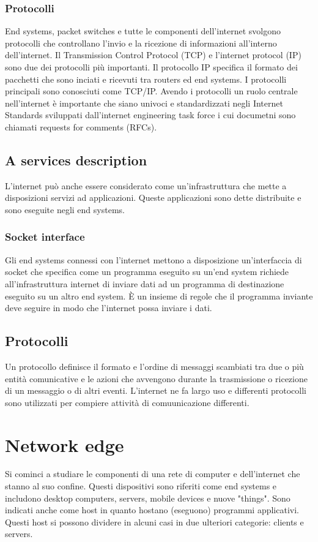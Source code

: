 \subsubsection{Protocolli}
End systems, packet switches e tutte le componenti dell'internet svolgono protocolli che controllano l'invio e la ricezione di informazioni all'interno dell'internet. Il Transmission Control Protocol (TCP) e 
l'internet protocol (IP) sono due dei protocolli pi\`u importanti. Il protocollo IP specifica il formato dei pacchetti che sono inciati e ricevuti tra routers ed end systems. I protocolli principali sono conosciuti come 
TCP/IP. Avendo i protocolli un ruolo centrale nell'internet \`e importante che siano univoci e standardizzati negli Internet Standards sviluppati dall'internet engineering task force i cui documetni sono chiamati
requests for comments (RFCs).
\subsection{A services description}
L'internet pu\`o anche essere considerato come un'infrastruttura che mette a disposizioni servizi ad applicazioni. Queste applicazioni sono dette distribuite e sono eseguite negli end systems. 
\subsubsection{Socket interface}
Gli end systems connessi con l'internet mettono a disposizione un'interfaccia di socket che specifica come un programma eseguito su un'end system richiede all'infrastruttura internet di inviare dati ad un
programma di destinazione eseguito su un altro end system. \`E un insieme di regole che il programma inviante deve seguire in modo che l'internet possa inviare i dati. 
\subsection{Protocolli}
Un protocollo definisce il formato e l'ordine di messaggi scambiati tra due o pi\`u entit\`a comunicative e le azioni che avvengono durante la trasmissione o ricezione di un messaggio o di altri eventi. L'internet
ne fa largo uso e differenti protocolli sono utilizzati per compiere attivit\`a di comuunicazione differenti. 
\section{Network edge}
Si cominci a studiare le componenti di una rete di computer e dell'internet che stanno al suo confine. Questi dispositivi sono riferiti come end systems e includono desktop computers, servers, mobile devices e 
nuove "things". Sono indicati anche come host in quanto hostano (eseguono) programmi applicativi. Questi host si possono dividere in alcuni casi in due ulteriori categorie: clients e servers. 
